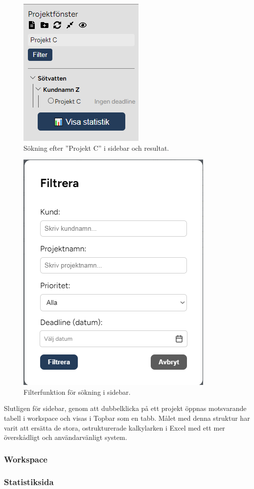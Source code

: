 \begin{figure}[H]  
\centering
    \includegraphics[width=0.5\linewidth]{images/sidebar_sok.PNG}
    \caption{Sökning efter ''Projekt C'' i sidebar och resultat.}
    \label{fig:sidebar_sok}
\end{figure}
\begin{figure}[H]  
\centering
    \includegraphics[width=0.5\linewidth]{images/sidebar_filter.PNG}
    \caption{Filterfunktion för sökning i sidebar.}
    \label{fig:sidebar_filter}
\end{figure}

\noindent Slutligen för sidebar, genom att dubbelklicka på ett projekt öppnas motsvarande tabell i workspace och visas i Topbar som en tabb.
Målet med denna struktur har varit att ersätta de stora, ostrukturerade kalkylarken i Excel med ett mer överskådligt och användarvänligt system.
\subsubsection{Workspace}
\subsubsection{Statistiksida}

\subsection{}